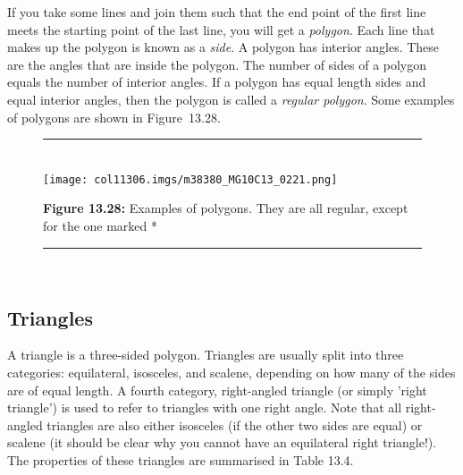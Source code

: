 \begin{table}[H]
      \label{m38380*id317435}If you take some lines and join them such that the
end point of the first line meets the starting point of the last line, you will
get a \textsl{polygon}. Each line that makes up the polygon is known as a
\textsl{side}. A polygon has interior angles. These are the angles that are
inside the polygon. The number of sides of a polygon equals the number of
interior angles. If a polygon has equal length sides and equal interior angles,
then the polygon is called a \textsl{regular polygon}. Some examples of polygons
are shown in Figure~13.28.\par 
      
    \setcounter{subfigure}{0}


	\begin{figure}[H] %
    \begin{center}
    \rule[.1in]{\figurerulewidth}{.005in} \\
       
\label{m38380*uid37!!!underscore!!!media}\label{
m38380*uid37!!!underscore!!!printimage}\texttt{[image: 
col11306.imgs/m38380\_MG10C13\_0221.png]} %
        
      \vspace{2pt}
    \vspace{\rubberspace}\par \begin{cnxcaption}
	  \small \textbf{Figure 13.28: }Examples of polygons. They are all
regular, except for the one marked *
	\end{cnxcaption}
      
    \vspace{.1in}
    \rule[.1in]{\figurerulewidth}{.005in} \\
        
    \end{center}

 \end{figure}   

    \addtocounter{footnote}{-0}
\vspace{-1cm}    
      \label{m38380*uid38}
        \subsection{ Triangles}
        \nopagebreak
        \label{m38380*id317485}A triangle is a three-sided polygon. Triangles
are usually split into three categories: equilateral, isosceles, and scalene,
depending on how many of the sides are of equal length. A fourth category,
right-angled triangle (or simply 'right triangle') is used to refer to triangles
with one right angle. Note that all right-angled triangles are also either
isosceles (if the other two sides are equal) or scalene (it should be clear why
you cannot have an equilateral right triangle!). The properties of these
triangles are summarised in Table 13.4.\par 
        

\end{table}
